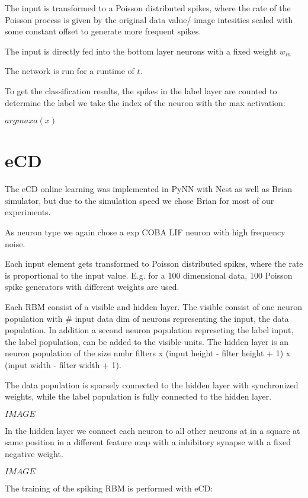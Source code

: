 The input is transformed to a Poisson distributed spikes, where the rate of the Poisson process is given by the original data value/ image intesities scaled with some constant offset to generate more frequent spikes. 
 
The input is directly fed into the bottom layer neurons with a fixed weight $w_{in}$     

The network is run for a runtime of $t$. 

To get the classification results, the spikes in the label layer are counted to determine the label we take the index of the neuron with the max activation:

$argmax a(x)$

\section{eCD}

The eCD online learning was implemented in PyNN with Nest as well as Brian simulator, but due to the  simulation speed we chose Brian for most of our experiments.

As neuron type we again chose a exp COBA LIF neuron with high frequency noise.

Each input element gets transformed to Poisson distributed spikes, where the rate is proportional to the input value. 
E.g. for a 100 dimensional data, 100 Poisson spike generators with different weights are used.

Each RBM consist of a visible and hidden layer. 
The visible consist of one neuron population with \# input data dim of neurons representing the input, the data population. 
In addition a second neuron population represeting the label input, the label population, can be added to the visible units.
The hidden layer is an neuron population of the size  nmbr filters x (input height - filter height + 1) x (input width - filter width + 1).

The data population is sparsely connected to the hidden layer with synchronized weights, while the label population is fully connected to the hidden layer.

$IMAGE$

In the hidden layer we connect each neuron to all other neurons at in a square at same position in a different feature map with a inhibitory synapse with a fixed negative weight.

$IMAGE$ 

The training of the spiking RBM is performed with eCD:

